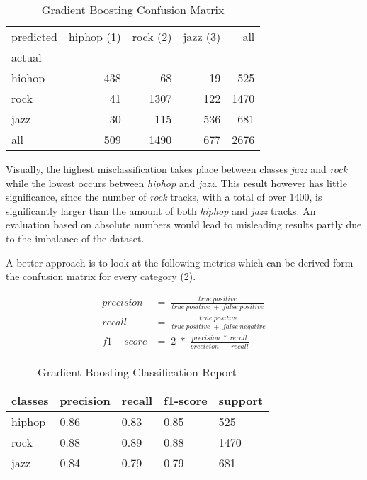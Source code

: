 \begin{table}[H]
  \centering
  \begin{tabular}{lrrrr}
    \toprule
    predicted & hiphop (1) & rock (2) & jazz (3) &   all \\
    actual &      &       &      &       \\
    \midrule
    hiohop &  438 &    68 &   19 &   525 \\
    rock   &   41 &  1307 &  122 &  1470 \\
    jazz   &   30 &   115 &  536 &   681 \\
    all    &  509 &  1490 &  677 &  2676 \\
    \bottomrule
    \end{tabular}
  \caption{Gradient Boosting Confusion Matrix}%
  \label{tbl:gb_confusion_matrix}%
\end{table} 

Visually, the highest misclassification takes place between classes \emph{jazz} and \emph{rock} while the lowest occurs
between \emph{hiphop} and \emph{jazz}. This result however has little significance, since the number of \emph{rock} tracks, with a total of over 
\(1400\), is significantly larger than the amount of both \emph{hiphop} and \emph{jazz} tracks. An evaluation based on absolute numbers would lead to 
misleading results partly due to the imbalance of the dataset. 

A better approach is to look at the following metrics which can be derived form the confusion matrix for every category \cite[p.235]{Davis_2006} \cite[p.862]{fawcett2006introduction}(\ref{tbl:gb_classification_Report}). 

\begin{equation*}
  \begin{aligned}
    precision &= \;\frac{true\:positive}{true\:positive\;+\;false\:positive}
    \\
    recall &= \;\frac{true\:positive}{true\:positive\;+\;false\:negative}
    \\
    f1-score &= \;2\;*\;\frac{precision\;*\;recall}{precision\;+\;recall}
  \end{aligned}
\end{equation*}

\begin{table}[H]
  \centering
  \begin{tabular}{lllll}
    \toprule
    classes & precision & recall & f1-score & support \\
    \midrule
     hiphop &      0.86 &   0.83 &     0.85 &     525 \\
       rock &      0.88 &   0.89 &     0.88 &    1470 \\
       jazz &      0.84 &   0.79 &     0.79 &     681 \\
    \bottomrule
    \end{tabular}
  \caption{Gradient Boosting Classification Report}%
  \label{tbl:gb_classification_Report}%
\end{table} 

